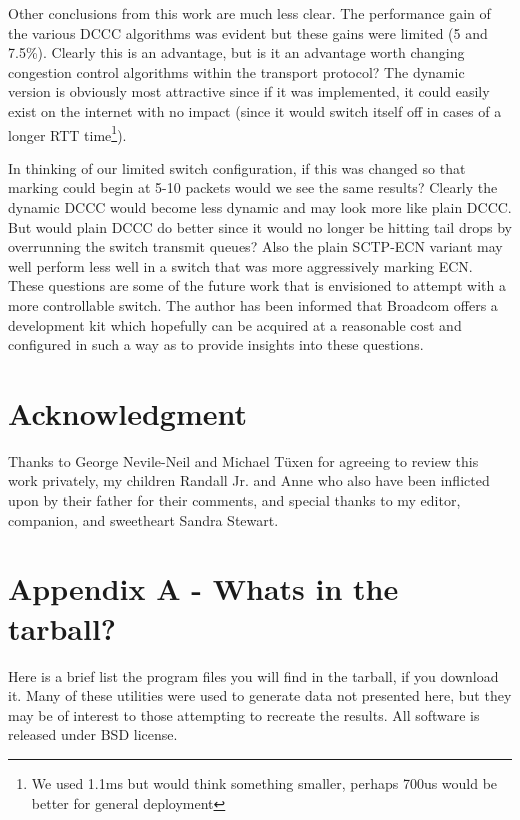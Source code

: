 \documentclass[12pt]{article}
\begin{document}
Other conclusions from this work are much less clear. The performance gain of the various DCCC algorithms
was evident but these gains were limited (5 and 7.5\%). Clearly this is an advantage, but is it an advantage
worth changing congestion control algorithms within the transport protocol? The dynamic version is obviously most
attractive since if it was implemented, it could easily exist on the internet with no impact (since it would switch itself
off in cases of a longer RTT time\footnote{We used 1.1ms but would think something smaller, perhaps 700us would
be better for general deployment}). 

In thinking of our limited switch configuration, if this was changed so that marking could begin at 5-10 packets
would we see the same results? Clearly the dynamic DCCC would become less dynamic and may look more
like plain DCCC. But would plain DCCC do better since it would no longer be hitting tail drops 
by overrunning the switch transmit queues? Also the plain SCTP-ECN variant may well perform less well 
in a switch that was more aggressively marking ECN. These questions are some of the future work that
is envisioned to attempt with a more controllable switch. The author has been informed that Broadcom
offers a development kit which hopefully can be acquired at a reasonable cost and configured in such
a way as to provide insights into these questions.
     

\section*{Acknowledgment}

Thanks to George Nevile-Neil and Michael T\"uxen for agreeing to review this work privately, my children Randall Jr. and Anne who also have been inflicted upon by their father for their comments, and special thanks to my editor,
companion, and sweetheart Sandra Stewart.

\section*{Appendix A - Whats in the tarball?}
Here is a brief list the program files you will find in the tarball, if you download it. Many of
these utilities were used to generate data not presented here, but they may be of interest
to those attempting to recreate the results. All software is released under BSD license.
\end{document}
